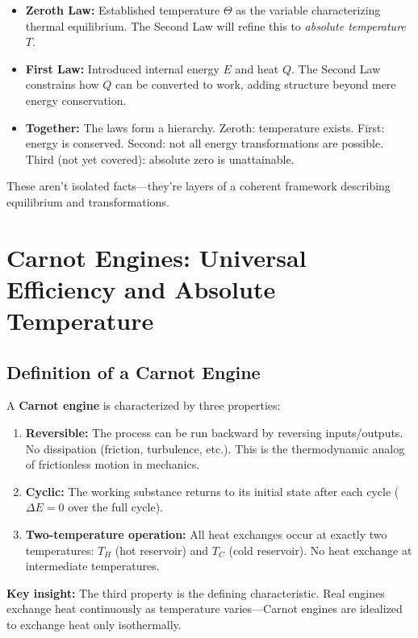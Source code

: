 \documentclass[9pt,twocoloumn]{article}
\begin{document}
\begin{itemize}
    \item \textbf{Zeroth Law:} Established temperature $\Theta$ as the variable characterizing thermal equilibrium. The Second Law will refine this to \emph{absolute temperature} $T$.
    \item \textbf{First Law:} Introduced internal energy $E$ and heat $Q$. The Second Law constrains how $Q$ can be converted to work, adding structure beyond mere energy conservation.
    \item \textbf{Together:} The laws form a hierarchy. Zeroth: temperature exists. First: energy is conserved. Second: not all energy transformations are possible. Third (not yet covered): absolute zero is unattainable.
\end{itemize}

These aren't isolated facts—they're layers of a coherent framework describing equilibrium and transformations.

\section{Carnot Engines: Universal Efficiency and Absolute Temperature}

\subsection{Definition of a Carnot Engine}
A \textbf{Carnot engine} is characterized by three properties:
\begin{enumerate}
    \item \textbf{Reversible:} The process can be run backward by reversing inputs/outputs. No dissipation (friction, turbulence, etc.). This is the thermodynamic analog of frictionless motion in mechanics.
    \item \textbf{Cyclic:} The working substance returns to its initial state after each cycle ($\Delta E = 0$ over the full cycle).
    \item \textbf{Two-temperature operation:} All heat exchanges occur at exactly two temperatures: $T_H$ (hot reservoir) and $T_C$ (cold reservoir). No heat exchange at intermediate temperatures.
\end{enumerate}

\textbf{Key insight:} The third property is the defining characteristic. Real engines exchange heat continuously as temperature varies—Carnot engines are idealized to exchange heat only isothermally.
\end{document}
